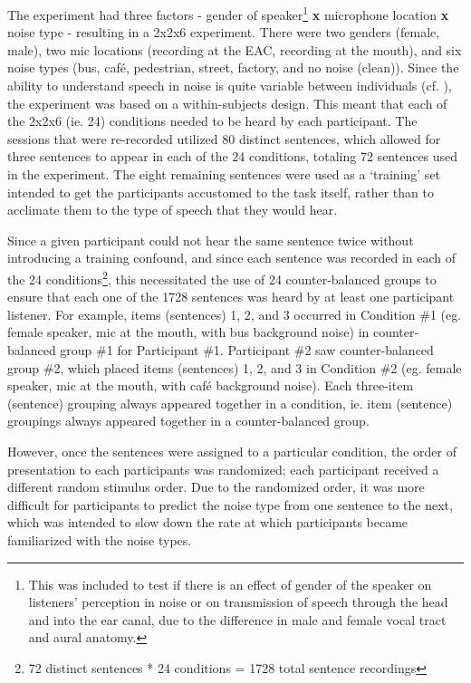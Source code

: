 The experiment had three factors - gender of speaker\footnote{This was included to test if there is an effect of gender of the speaker on listeners' perception in noise or on transmission of speech through the head and into the ear canal, due to the difference in male and female vocal tract and aural anatomy.} \textbf{x} microphone location \textbf{x} noise type - resulting in a 2x2x6 experiment.  There were two genders (female, male), two mic locations (recording at the EAC, recording at the mouth), and six noise types (bus, caf\'{e}, pedestrian, street, factory, and no noise (clean)).  Since the ability to understand speech in noise is quite variable between individuals (cf. \cite{ding:13,gilbert:13}), the experiment was based on a within-subjects design.  This meant that each of the 2x2x6 (ie. 24) conditions needed to be heard by each participant.  The sessions that were re-recorded utilized 80 distinct sentences, which allowed for three sentences to appear in each of the 24 conditions, totaling 72 sentences used in the experiment.  The eight remaining sentences were used as a `training' set intended to get the participants accustomed to the task itself, rather than to acclimate them to the type of speech that they would hear.

Since a given participant could not hear the same sentence twice without introducing a training confound, and since each sentence was recorded in each of the 24 conditions\footnote{72 distinct sentences * 24 conditions = 1728 total sentence recordings}, this necessitated the use of 24 counter-balanced groups to ensure that each one of the 1728 sentences was heard by at least one participant listener.  For example, items (sentences) 1, 2, and 3 occurred in Condition \#1 (eg. female speaker, mic at the mouth, with bus background noise) in counter-balanced group \#1 for Participant \#1. Participant \#2 saw counter-balanced group \#2, which placed items (sentences) 1, 2, and 3 in Condition \#2 (eg. female speaker, mic at the mouth, with caf\'{e} background noise).  Each three-item (sentence) grouping always appeared together in a condition, ie. item (sentence) groupings always appeared together in a counter-balanced group.  

However, once the sentences were assigned to a particular condition, the order of presentation to each participants was randomized; each participant received a different random stimulus order.  Due to the randomized order, it was more difficult for participants to predict the noise type from one sentence to the next, which was intended to slow down the rate at which participants became familiarized with the noise types.

